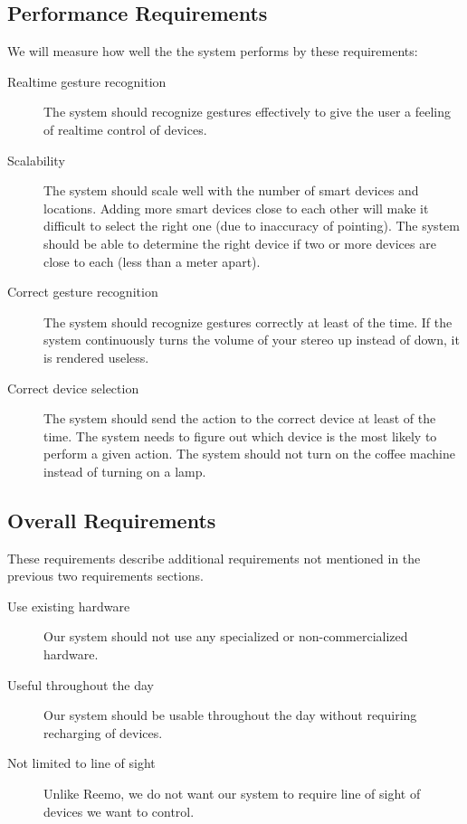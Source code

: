 \subsection{Performance Requirements}
We will measure how well the the system performs by these requirements:
\begin{description}
    \item[Realtime gesture recognition] The system should recognize gestures effectively to give the user a feeling of realtime control of devices. %
    \item[Scalability] The system should scale well with the number of smart devices and locations. Adding more smart devices close to each other will make it difficult to select the right one (due to inaccuracy of pointing). The system should be able to determine the right device if two or more devices are close to each (less than a meter apart).
    \item[Correct gesture recognition] The system should recognize gestures correctly at least  of the time. If the system continuously turns the volume of your stereo up instead of down, it is rendered useless.  
    \item[Correct device selection] The system should send the action to the correct device at least  of the time. The system needs to figure out which device is the most likely to perform a given action. The system should not turn on the coffee machine instead of turning on a lamp.
\end{description}
    
\subsection{Overall Requirements}
These requirements describe additional requirements not mentioned in the previous two requirements sections.
\begin{description}
    \item[Use existing hardware] Our system should not use any specialized or non-commercialized hardware.  
    \item[Useful throughout the day] Our system should be usable throughout the day without requiring recharging of devices. 
    \item[Not limited to line of sight] Unlike Reemo, we do not want our system to require line of sight of devices we want to control. 
\end{description}

